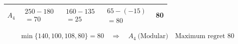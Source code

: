 {\begin{minipage}[t]{0.51\textwidth}
\begin{tabular}{@{}lcccc@{}}
    $A_4$ & $\begin{gathered}250-180\\=70\end{gathered}$ & $\begin{gathered}160-135\\=25\end{gathered}$ & $\begin{gathered}65-(-15)\\=80\end{gathered}$ & 80\\
    \bottomrule
  \end{tabular}
\end{minipage}
\[
  \min\{140,100,108,80\}=80
  \quad\Longrightarrow\quad
  \boxed{A_4\ \text{(Modular)}\quad\text{Maximum regret }80}
\]
}

\clearpage
{}
